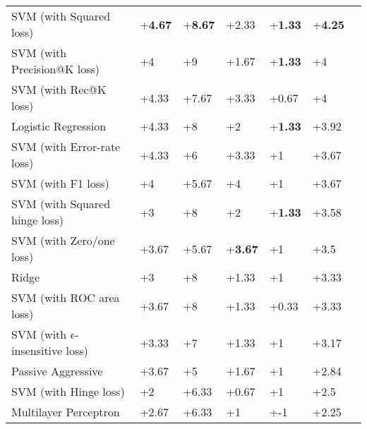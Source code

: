 \begin{table}[h!]
{\begin{tabular}{@{}lllllll@{}}
SVM (with Squared loss)                               & +\textbf{4.67}  & +\textbf{8.67}     & +2.33           & +\textbf{1.33}     & +\textbf{4.25} \\
SVM (with Precision@K loss)                            & +4              & +9                 & +1.67           & +\textbf{1.33}     & +4             \\
SVM (with Rec@K loss)                                 & +4.33           & +7.67              & +3.33           & +0.67              & +4             \\
Logistic Regression                                    & +4.33           & +8                 & +2              & +\textbf{1.33}     & +3.92          \\
SVM (with Error-rate loss)                             & +4.33           & +6                 & +3.33           & +1                 & +3.67          \\
SVM (with F1 loss)                                     & +4              & +5.67              & +4              & +1                 & +3.67          \\
SVM (with Squared hinge loss)                           & +3              & +8                 & +2              & +\textbf{1.33}     & +3.58          \\
SVM (with Zero/one loss)                               & +3.67           & +5.67              & +\textbf{3.67}  & +1                 & +3.5           \\
Ridge                                                   & +3              & +8                 & +1.33           & +1                 & +3.33          \\
SVM (with ROC area loss)                                & +3.67           & +8                 & +1.33           & +0.33              & +3.33          \\
SVM (with $\epsilon$-insensitive loss)                   & +3.33           & +7                 & +1.33           & +1                 & +3.17          \\
Passive Aggressive                                       & +3.67           & +5                 & +1.67           & +1                 & +2.84          \\
SVM (with Hinge loss)                                    & +2              & +6.33              & +0.67           & +1                 & +2.5           \\
Multilayer Perceptron                                 & +2.67           & +6.33              & +1              & +-1                & +2.25          \\

\end{tabular}}
\end{table}
